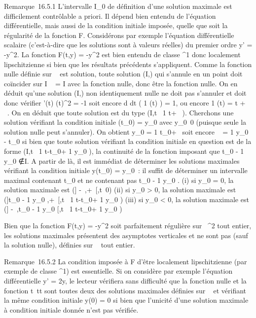 \documentclass[]{article}
\begin{document}
Remarque~16.5.1 L'intervalle I\_0 de définition d'une solution
maximale est difficilement contrôlable a priori. Il dépend bien entendu
de l'équation différentielle, mais aussi de la condition initiale
imposée, quelle que soit la régularité de la fonction F. Considérons par
exemple l'équation différentielle scalaire (c'est-à-dire que les
solutions sont à valeurs réelles) du premier ordre y' = -y^2.
La fonction F(t,y) = -y^2 est bien entendu de classe
^1 donc localement lipschitzienne si bien que les résultats
précédents s'appliquent. Comme la fonction nulle définie sur ~ est
solution, toute solution (I,\phi) qui s'annule en un point doit coïncider
sur I \bigcap {}~ = I avec la fonction nulle, donc être la fonction nulle. On en
déduit qu'une solution (I,\phi) non identiquement nulle ne doit pas
s'annuler et doit donc vérifier  \phi'(t) \over
\phi(t)^2 = -1 soit encore  d \over dt
\left ( 1 \over \phi(t)
\right ) = 1, ou encore  1 \over \phi(t)
= t + \lambda~. On en déduit que toute solution est du type
(I,t\mapsto~ 1 \over t+\lambda~ ).
Cherchons une solution vérifiant la condition initiale \phi(t\_0) =
y\_0 avec y\_0\neq~0 (puisque
seule la solution nulle peut s'annuler). On obtient y\_0 = 1
\over t\_0+\lambda~ soit encore \lambda~ = 1
\over y\_0 - t\_0 si bien que toute
solution vérifiant la condition initiale en question est de la forme
(I,t\mapsto~ 1 \over
t-t\_0+ 1 \over y\_0  ), la
continuité de la fonction imposant que t\_0 - 1
\over y\_0 ∉I. A
partir de là, il est immédiat de déterminer les solutions maximales
vérifiant la condition initiale y(t\_0) = y\_0~: il
suffit de déterminer un intervalle maximal contenant t\_0 et ne
contenant pas t\_0 - 1 \over y\_0 .
(i) si y\_0 = 0, la solution maximale est ({]}
-\infty~,+\infty~{[},t\mapsto~0) (ii) si y\_0
\textgreater{} 0, la solution maximale est ({]}t\_0 - 1
\over y\_0
,+\infty~{[},t\mapsto~ 1 \over
t-t\_0+ 1 \over y\_0  ) (iii) si
y\_0 \textless{} 0, la solution maximale est ({]}
-\infty~,t\_0 - 1 \over y\_0
{[},t\mapsto~ 1 \over
t-t\_0+ 1 \over y\_0  )

Bien que la fonction F(t,y) = -y^2 soit parfaitement
régulière sur ~^2 tout entier, les solutions maximales
présentent des asymptotes verticales et ne sont pas (sauf la solution
nulle), définies sur ~ tout entier.

Remarque~16.5.2 La condition imposée à F d'être localement
lipschitzienne (par exemple de classe ^1) est essentielle.
Si on considère par exemple l'équation différentielle y' =
2\sqrt\textbar{}y\textbar{}, le lecteur vérifiera
sans difficulté que la fonction nulle et la fonction
t\mapsto~t\textbar{}t\textbar{} sont toutes deux des
solutions maximales définies sur ~ et vérifiant la même condition
initiale y(0) = 0 si bien que l'unicité d'une solution maximale à
condition initiale donnée n'est pas vérifiée.
\end{document}
